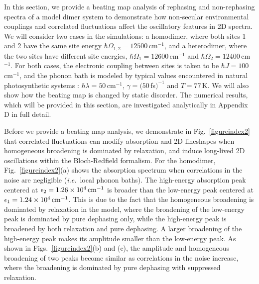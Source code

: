 \documentclass[%
 reprint,%
 amssymb, amsmath,%
 aip,cha,%
]{revtex4-1}
\begin{document}

In this section, we provide a beating map analysis of rephasing and non-rephasing spectra of a model dimer system to demonstrate how non-secular environmental couplings and correlated fluctuations affect the oscillatory features in 2D spectra.  We will consider two cases in the simulations: a homodimer, where both sites 1 and 2 have the same site energy $\hbar\Omega_{1,2}=12500\,$cm$^{-1}$, and a heterodimer, where the two sites have different site energies, $\hbar\Omega_1 = 12600\,$cm$^{-1}$ and $\hbar\Omega_2 = 12400\,$cm$^{-1}$.  For both cases, the electronic coupling between sites is taken to be $\hbar J = 100\,$cm$^{-1}$, and the phonon bath is modeled by typical values encountered in natural photosynthetic systems \cite{IshizakiPCCP2010}: $\hbar\lambda = 50\,$cm$^{-1}$, $\gamma = (50\,$fs$)^{-1}$ and $T=77\,$K.  We will also show how the beating map is changed by static disorder.  The numerical results, which will be provided in this section, are investigated analytically in Appendix D in full detail.

Before we provide a beating map analysis, we demonstrate in Fig.~\ref{figureindex2} that correlated fluctuations can modify absorption and 2D lineshapes when homogeneous broadening is dominated by relaxation, and induce long-lived 2D oscillations within the Bloch-Redfield formalism.  For the homodimer, Fig.~\ref{figureindex2}(a) shows the absorption spectrum when correlations in the noise are negligible ({\it i.e.}~local phonon baths). The high-energy absorption peak centered at $\epsilon_2=1.26\times 10^{4}\,{\rm cm}^{-1}$ is broader than the low-energy peak centered at $\epsilon_1=1.24\times 10^{4}\,{\rm cm}^{-1}$. This is due to the fact that the homogeneous broadening is dominated by relaxation in the model, where the broadening of the low-energy peak is dominated by pure dephasing only, while the high-energy peak is broadened by both relaxation and pure dephasing. A larger broadening of the high-energy peak makes its amplitude smaller than the low-energy peak. As shown in Figs.~\ref{figureindex2}(b) and (c), the amplitude and homogeneous broadening of two peaks become similar as correlations in the noise increase, where the broadening is dominated by pure dephasing with suppressed relaxation.
\end{document}
